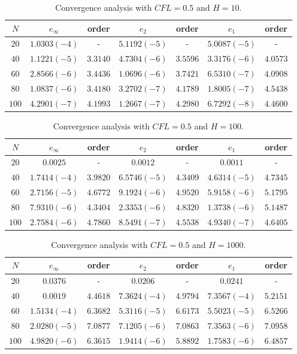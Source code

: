 \documentclass[10pt,a4paper]{amsart}
\begin{document}
\begin{table}%
\begin{tabular}{c|c|c|c|c|c|c}
$N$ & $e_{\infty}$ & order & $e_2$ & order & $e_1$ & order \\ 
\hline 
\hline
$20$ & $1.0303 (-4)$ & - & $5.1192 (-5)$ & - & $5.0087 (-5)$ & - \\ 
\hline 
$40$ & $1.1221 (-5)$ & $3.3140$ & $4.7304 (-6)$ & $3.5596$ & $3.3176 (-6)$ & $4.0573$ \\ 
\hline 
$60$ & $2.8566 (-6)$ & $3.4436$ & $1.0696 (-6)$ & $3.7421$ & $6.5310 (-7)$ & $4.0908$ \\
\hline 
$80$ & $1.0837 (-6)$ & $3.4180$ & $3.2702 (-7)$ & $4.1789$ & $1.8005 (-7)$ & $4.5438$ \\ 
\hline 
$100$ & $4.2901(-7)$ & $4.1993$ & $1.2667 (-7)$ & $4.2980$ & $6.7292 (-8)$ & $4.4600$  \\ 
\end{tabular} 
\caption{Convergence analysis with $CFL=0.5$ and $H=10$.}
\label{CV_order8_hp10}
\end{table}

\begin{table}%
\begin{tabular}{c|c|c|c|c|c|c}
$N$ & $e_{\infty}$ & order & $e_2$ & order & $e_1$ & order \\ 
\hline 
\hline
$20$ & $0.0025$ & - & $0.0012$ & - & $0.0011$ & - \\ 
\hline 
$40$ & $1.7414 (-4)$ & $3.9820$ & $6.5746 (-5)$ & $4.3409$ & $4.6314 (-5)$ & $4.7345$ \\ 
\hline 
$60$ & $2.7156 (-5)$ & $4.6772$ & $9.1924 (-6)$ & $4.9520$ & $5.9158 (-6)$ & $5.1795$ \\
\hline 
$80$ & $7.9310 (-6)$ & $4.3404$ & $2.3353 (-6)$ & $4.8320$ & $1.3738 (-6)$ & $5.1487$ \\ 
\hline 
$100$ & $2.7584(-6)$ & $4.7860$ & $8.5491 (-7)$ & $4.5538$ & $4.9340 (-7)$ & $4.6405$  \\ 
\end{tabular} 
\caption{Convergence analysis with $CFL=0.5$ and $H=100$.}
\label{CV_order8_hp100}
\end{table}

\begin{table}%
\begin{tabular}{c|c|c|c|c|c|c}
$N$ & $e_{\infty}$ & order & $e_2$ & order & $e_1$ & order \\ 
\hline 
\hline
$20$ & $0.0376$ & - & $0.0206$ & - & $0.0241$ & - \\ 
\hline 
$40$ & $0.0019$ & $4.4618$ & $7.3624 (-4)$ & $4.9794$ & $7.3567 (-4)$ & $5.2151$ \\ 
\hline 
$60$ & $1.5134 (-4)$ & $6.3682$ & $5.3116 (-5)$ & $6.6173$ & $5.5023 (-5)$ & $6.5266$ \\
\hline 
$80$ & $2.0280 (-5)$ & $7.0877$ & $7.1205 (-6)$ & $7.0863$ & $7.3563 (-6)$ & $7.0958$ \\ 
\hline 
$100$ & $4.9820(-6)$ & $6.3615$ & $1.9414 (-6)$ & $5.8892$ & $1.7583 (-6)$ & $6.4857$  \\ 
\end{tabular} 
\caption{Convergence analysis with $CFL=0.5$ and $H=1000$.}
\label{CV_order8_hp1000}
\end{table}
\end{document}

